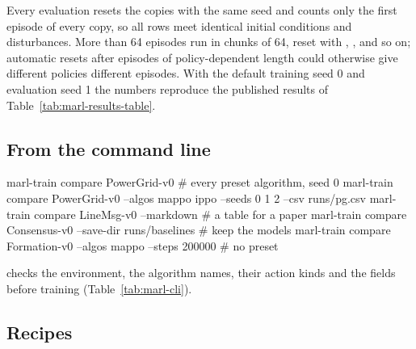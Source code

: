 Every evaluation resets the copies with the same seed and counts only the
first episode of every copy, so all rows meet identical initial conditions and
disturbances. More than 64 episodes run in chunks of 64, reset with
, , and so on; automatic resets after
episodes of policy-dependent length could otherwise give different policies
different episodes. With the default training seed 0 and evaluation seed 1
the numbers reproduce the published results of
Table~\ref{tab:marl-results-table}.

\subsection{From the command line}

\begin{shellcode}
marl-train compare PowerGrid-v0                   # every preset algorithm, seed 0
marl-train compare PowerGrid-v0 --algos mappo ippo --seeds 0 1 2 --csv runs/pg.csv
marl-train compare LineMsg-v0 --markdown          # a table for a paper
marl-train compare Consensus-v0 --save-dir runs/baselines   # keep the models
marl-train compare Formation-v0 --algos mappo --steps 200000  # no preset
\end{shellcode}

 checks the environment, the algorithm names, their
action kinds and the  fields before training
(Table~\ref{tab:marl-cli}).

\subsection{Recipes}

